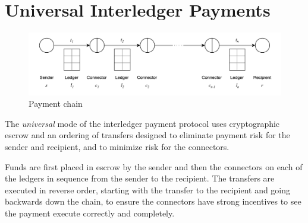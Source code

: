 \documentclass[letterpaper,twocolumn,10pt]{article}
\begin{document}




\section{Universal Interledger Payments}

\begin{figure}[th!]
    \centering
    \includegraphics[width=\textwidth]{figures/payment-chain.pdf}
    \caption{Payment chain}
    \label{fig:n-bells}
\end{figure}

The \textit{universal} mode of the interledger payment protocol uses cryptographic escrow and an ordering of transfers designed to eliminate payment risk for the sender and recipient, and to minimize risk for the connectors.


Funds are first placed in escrow by the sender and then the connectors on each of the ledgers in sequence from the sender to the recipient. The transfers are executed in reverse order, starting with the transfer to the recipient and going backwards down the chain, to ensure the connectors have strong incentives to see the payment execute correctly and completely.
\end{document}
